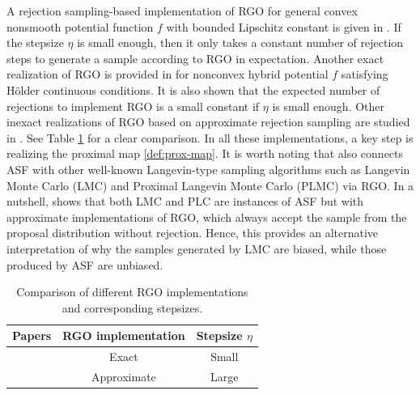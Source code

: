 \documentclass[11pt,letterpaper]{article}
\begin{document}

A rejection sampling-based implementation of RGO for general convex nonsmooth potential function $f$ with bounded Lipschitz constant is given in \cite{liang2022proximal}. 
If the stepsize $\eta$ is small enough, then it only takes a constant number of rejection steps to generate a sample according to RGO in expectation.
Another exact realization of RGO is provided in \cite{liang2023a} for nonconvex hybrid potential $f$ satisfying Hölder continuous conditions. It is also shown that the expected number of rejections to implement RGO is a small constant if $\eta$ is small enough. Other inexact realizations of RGO based on approximate rejection sampling are studied in \cite{gopi2022private,fan2023improved}. 
See Table \ref{tab:rgo} for a clear comparison.
In all these implementations, a key step is realizing the proximal map \eqref{def:prox-map}. It is worth noting that \cite{liang2023a} also connects ASF with other well-known Langevin-type sampling algorithms such as Langevin Monte Carlo (LMC) and Proximal Langevin Monte Carlo (PLMC) via RGO. In a nutshell, \cite{liang2023a} shows that both LMC and PLC are instances of ASF but with approximate implementations of RGO, which always accept the sample from the proposal distribution without rejection. Hence, this provides an alternative interpretation of why the samples generated by LMC are biased, while those produced by ASF are unbiased.

\begin{table}[t]
    \centering
    \begin{tabular}{ccc}
        \toprule
        \textbf{Papers} & \textbf{RGO implementation} & \textbf{Stepsize $\eta$} \\
        \midrule
        \cite{liang2022proximal,liang2023a} & Exact & Small \\ 
        \cite{gopi2022private,fan2023improved} & Approximate & Large \\ 
        \bottomrule
    \end{tabular}
    \caption{Comparison of different RGO implementations and corresponding stepsizes.}
    \label{tab:rgo}
\end{table}
\end{document}
